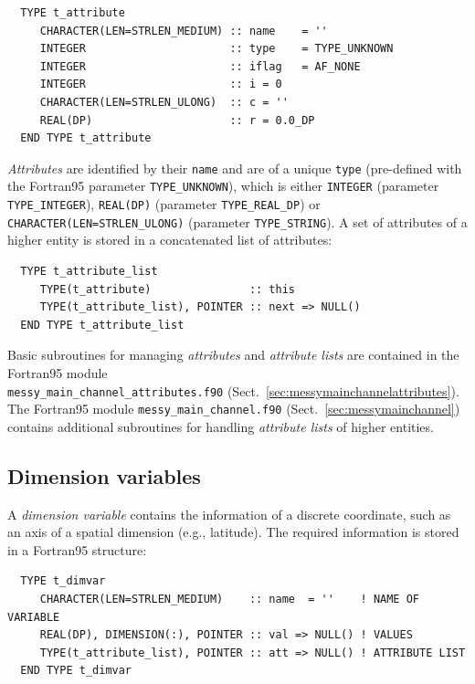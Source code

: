 \documentclass[twoside]{article}
\begin{document}
\begin{verbatim}
  TYPE t_attribute
     CHARACTER(LEN=STRLEN_MEDIUM) :: name    = ''
     INTEGER                      :: type    = TYPE_UNKNOWN
     INTEGER                      :: iflag   = AF_NONE
     INTEGER                      :: i = 0
     CHARACTER(LEN=STRLEN_ULONG)  :: c = ''
     REAL(DP)                     :: r = 0.0_DP
  END TYPE t_attribute
\end{verbatim}

{\it Attributes} are identified by their {\tt name} and are of a unique
{\tt type} (pre-defined with the Fortran95 parameter {\tt TYPE\_UNKNOWN}),
which is either {\tt INTEGER} (parameter {\tt TYPE\_INTEGER}),
{\tt REAL(DP)} (parameter {\tt TYPE\_REAL\_DP}) or\\
{\tt CHARACTER(LEN=STRLEN\_ULONG)} (parameter {\tt TYPE\_STRING}).
A set of attributes of a higher entity is stored in a concatenated list
of attributes:

\begin{verbatim}
  TYPE t_attribute_list
     TYPE(t_attribute)               :: this
     TYPE(t_attribute_list), POINTER :: next => NULL()
  END TYPE t_attribute_list
\end{verbatim}

Basic subroutines for managing {\it attributes} and {\it attribute lists}
are contained in the Fortran95 module\\
{\tt messy\_main\_channel\_attributes.f90}
(Sect.~\ref{sec:messymainchannelattributes}).
The Fortran95 module {\tt messy\_main\_channel.f90}
(Sect.~\ref{sec:messymainchannel}) contains additional subroutines for
handling {\it attribute lists} of higher entities.

\subsection{Dimension variables}
\label{sec:dimvar}

A {\it dimension variable} contains the information of a discrete coordinate,
such as an axis of a spatial dimension (e.g., latitude). The required
information is stored in a Fortran95 structure:

\begin{verbatim}
  TYPE t_dimvar
     CHARACTER(LEN=STRLEN_MEDIUM)    :: name  = ''    ! NAME OF VARIABLE
     REAL(DP), DIMENSION(:), POINTER :: val => NULL() ! VALUES
     TYPE(t_attribute_list), POINTER :: att => NULL() ! ATTRIBUTE LIST
  END TYPE t_dimvar
\end{verbatim}
\end{document}
